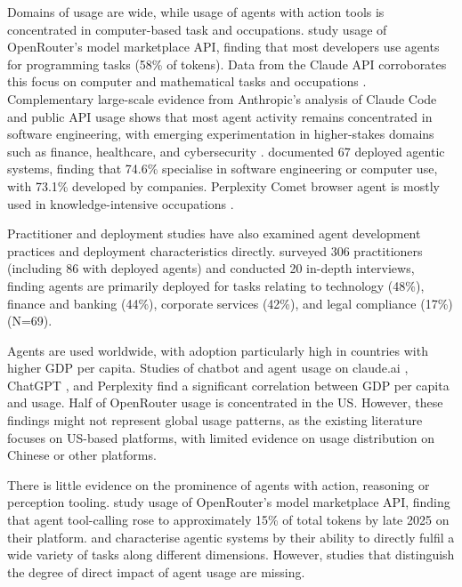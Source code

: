 \documentclass[manuscript,screen,nonacm,oneside]{acmart}
\begin{document}
Domains of usage are wide, while usage of agents with action tools is concentrated in computer-based task and occupations. \citep{aubakirova2025state} study usage of OpenRouter's model marketplace API, finding that most developers use agents for programming tasks (58\% of tokens). Data from the Claude API corroborates this focus on computer and mathematical tasks and occupations \citep{anthropic2026aeiv4}. Complementary large-scale evidence from Anthropic's analysis of Claude Code and public API usage shows that most agent activity remains concentrated in software engineering, with emerging experimentation in higher-stakes domains such as finance, healthcare, and cybersecurity \citep{anthropic2026agents}. \citep{casper2025agent} documented 67 deployed agentic systems, finding that 74.6\% specialise in software engineering or computer use, with 73.1\% developed by companies. Perplexity Comet browser agent is mostly used in knowledge-intensive occupations \citep{perplexityCometBrowser}.

Practitioner and deployment studies have also examined agent development practices and deployment characteristics directly. \citep{pan2025measuring} surveyed 306 practitioners (including 86 with deployed agents) and conducted 20 in-depth interviews, finding agents are primarily deployed for tasks relating to technology (48\%), finance and banking (44\%), corporate services (42\%), and legal compliance (17\%) (N=69).

Agents are used worldwide, with adoption particularly high in countries with higher GDP per capita. Studies of chatbot and agent usage on claude.ai \citep{handa2025which}, ChatGPT \citep{chatterji2025people}, and Perplexity \citep{perplexityCometBrowser} find a significant correlation between GDP per capita and usage. Half of OpenRouter usage \citep{aubakirova2025state} is concentrated in the US. However, these findings might not represent global usage patterns, as the existing literature focuses on US-based platforms, with limited evidence on usage distribution on Chinese or other platforms.

There is little evidence on the prominence of agents with action, reasoning or perception tooling. \citep{aubakirova2025state} study usage of OpenRouter's model marketplace API, finding that agent tool-calling rose to approximately 15\% of total tokens by late 2025 on their platform. \citep{kasirzadeh2025characterizing} and \citep{casper2025agent} characterise agentic systems by their ability to directly fulfil a wide variety of tasks along different dimensions. However, studies that distinguish the degree of direct impact of agent usage are missing.
\end{document}
